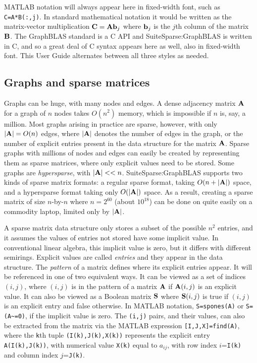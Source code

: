 \documentclass[12pt]{article}
\begin{document}
MATLAB notation will always appear here in fixed-width font, such as
\verb'C=A*B(:,j)'.  In standard mathematical notation it would be written as
the matrix-vector multiplication ${\bf C = A b}_j$ where ${\bf b}_j$ is the
$j$th column of the matrix ${\bf B}$.  The GraphBLAS standard is a C API and
SuiteSparse:GraphBLAS is written in C, and so a great deal of C syntax appears
here as well, also in fixed-width font.  This User Guide alternates between all
three styles as needed.

\subsection{Graphs and sparse matrices} %
\label{sparse}

Graphs can be huge, with many nodes and edges.  A dense adjacency matrix ${\bf
A}$ for a graph of $n$ nodes takes $O(n^2)$ memory, which is impossible if $n$
is, say, a million.  Most graphs arising in practice are sparse, however, with
only $|{\bf A}|=O(n)$ edges, where $|{\bf A}|$ denotes the number of edges in
the graph, or the number of explicit entries present in the data structure for
the matrix ${\bf A}$.  Sparse graphs with millions of nodes and edges can
easily be created by representing them as sparse matrices, where only explicit
values need to be stored.  Some graphs are {\em hypersparse}, with ${|\bf A}|
<< n$.  SuiteSparse:GraphBLAS supports two kinds of sparse matrix formats: a
regular sparse format, taking $O(n+|{\bf A}|)$ space, and a hypersparse format
taking only $O(|{\bf A}|)$ space.  As a result, creating a sparse matrix of
size $n$-by-$n$ where $n=2^{60}$ (about $10^{18}$) can be done on quite easily
on a commodity laptop, limited only by $|{\bf A}|$.

A sparse matrix data structure only stores a subset of the possible $n^2$
entries, and it assumes the values of entries not stored have some implicit
value.  In conventional linear algebra, this implicit value is zero, but it
differs with different semirings.  Explicit values are called {\em entries} and
they appear in the data structure.  The {\em pattern} of a matrix  defines
where its explicit entries appear.  It will be referenced in one of two
equivalent ways.  It can be viewed as a set of indices $(i,j)$, where $(i,j)$
is in the pattern of a matrix ${\bf A}$ if ${\bf A}(i,j)$ is an explicit value.
It can also be viewed as a Boolean matrix ${\bf S}$ where ${\bf S}(i,j)$ is
true if $(i,j)$ is an explicit entry and false otherwise.  In MATLAB notation,
\verb'S=spones(A)' or \verb'S=(A~=0)', if the implicit value is zero.  The
\verb'(i,j)' pairs, and their values, can also be extracted from the matrix via
the MATLAB expression \verb'[I,J,X]=find(A)', where the \verb'k'th tuple
\verb'(I(k),J(k),X(k))' represents the explicit entry \verb'A(I(k),J(k))', with
numerical value \verb'X(k)' equal to $a_{ij}$, with row index $i$=\verb'I(k)'
and column index $j$=\verb'J(k)'.
\end{document}
